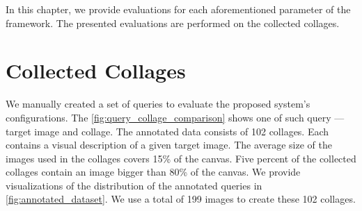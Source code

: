 In this chapter, we provide evaluations for each aforementioned parameter of the framework. The presented evaluations are performed on the collected collages.

\section{Collected Collages}

We manually created a set of queries to evaluate the proposed system's configurations. The \autoref{fig:query_collage_comparison} shows one of such query --- target image and collage. The annotated data consists of 102 collages. Each contains a visual description of a given target image. The average size of the images used in the collages covers 15\% of the canvas. Five percent of the collected collages contain an image bigger than 80\% of the canvas. We provide visualizations of the distribution of the annotated queries in  \autoref{fig:annotated_dataset}. We use a total of 199 images to create these 102 collages.

